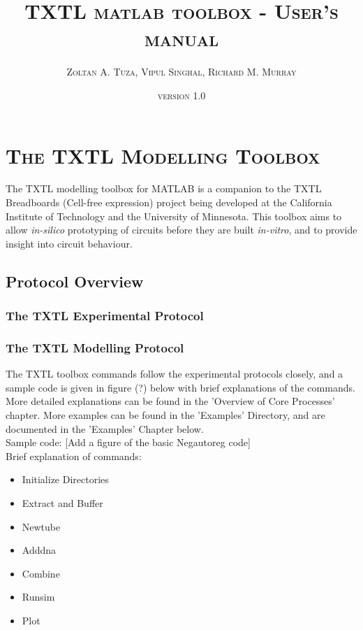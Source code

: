 \documentclass[english]{report}
\begin{document}
\title{\textsc{TXTL matlab toolbox - User's manual}}
\date{\textsc{version 1.0}}
\author{\textsc{Zoltan A. Tuza, Vipul Singhal, Richard M. Murray}}
\maketitle
\textsc{\tableofcontents}

\chapter{\textsc{The TXTL Modelling Toolbox}}

The TXTL modelling toolbox for MATLAB is a companion to the TXTL Breadboards (Cell-free expression) project being developed at the California Institute of Technology and the University of Minnesota. This toolbox aims to allow \textit{in-silico} prototyping of circuits before they are built \textit{in-vitro}, and to provide insight into circuit behaviour. 

	\section{Protocol Overview}

		\subsection{The TXTL Experimental Protocol}
		\subsection{The TXTL Modelling Protocol}
		The TXTL toolbox commands follow the experimental protocols closely, and a sample code is given in figure (?) below with brief explanations of the commands. More detailed explanations can be found in the 'Overview of Core Processes' chapter. More examples can be found in the 'Examples' Directory, and are documented in the 'Examples' Chapter below. \\

\noindent Sample code:
[Add a figure of the basic Negautoreg code] \\

\noindent Brief explanation of commands:
\begin{itemize}
	\item Initialize Directories
	\item Extract and Buffer
	\item Newtube
	\item Adddna
	\item Combine
	\item Runsim
	\item Plot
\end{itemize}
\end{document}
